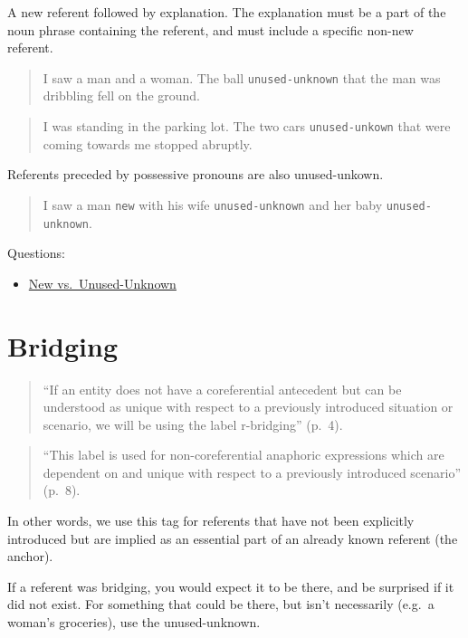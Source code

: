 \documentclass[
]{book}
\providecommand{\tightlist}{%
  \setlength{\itemsep}{0pt}\setlength{\parskip}{0pt}}
\begin{document}
A new referent followed by explanation.
The explanation must be a part of the noun phrase containing the referent, and must include a specific non-new referent.

\begin{quote}
I saw a man and a woman.
The ball \texttt{unused-unknown} that the man was dribbling fell on the ground.
\end{quote}

\begin{quote}
I was standing in the parking lot.
The two cars \texttt{unused-unkown} that were coming towards me stopped abruptly.
\end{quote}

Referents preceded by possessive pronouns are also unused-unkown.

\begin{quote}
I saw a man \texttt{new} with his wife \texttt{unused-unknown} and her baby \texttt{unused-unknown}.
\end{quote}

Questions:

\begin{itemize}
\tightlist
\item
  \protect\hyperlink{new-vs.-unused-unknown}{New vs.~Unused-Unknown}
\end{itemize}

\hypertarget{bridging}{%
\section{Bridging}\label{bridging}}

\begin{quote}
``If an entity does not have a coreferential antecedent but can be understood as unique with respect to a previously introduced situation or scenario, we will be using the label r-bridging'' (p.~4).
\end{quote}

\begin{quote}
``This label is used for non-coreferential anaphoric expressions which are dependent on and unique with respect to a previously introduced scenario'' (p.~8).
\end{quote}

In other words, we use this tag for referents that have not been explicitly introduced but are implied as an essential part of an already known referent (the anchor).

If a referent was bridging, you would expect it to be there, and be surprised if it did not exist.
For something that could be there, but isn't necessarily (e.g.~a woman's groceries), use the unused-unknown.
\end{document}
